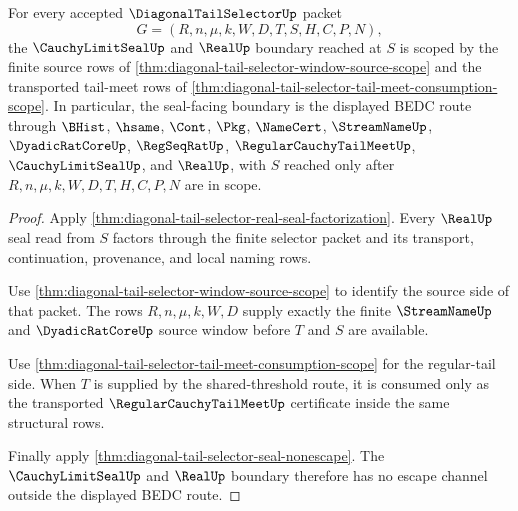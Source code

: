 \begin{theorem}
\label{thm:diagonal-tail-selector-real-seal-boundary-scope}
For every accepted $\DiagonalTailSelectorUp$ packet
$$
G=(R,n,\mu,k,W,D,T,S,H,C,P,N),
$$
the $\CauchyLimitSealUp$ and $\RealUp$ boundary reached at $S$ is scoped by
the finite source rows of \autoref{thm:diagonal-tail-selector-window-source-scope}
and the transported tail-meet rows of
\autoref{thm:diagonal-tail-selector-tail-meet-consumption-scope}. In
particular, the seal-facing boundary is the displayed BEDC route through
$\BHist$, $\hsame$, $\Cont$, $\Pkg$, $\NameCert$, $\StreamNameUp$,
$\DyadicRatCoreUp$, $\RegSeqRatUp$, $\RegularCauchyTailMeetUp$,
$\CauchyLimitSealUp$, and $\RealUp$, with $S$ reached only after
$R,n,\mu,k,W,D,T,H,C,P,N$ are in scope.
\end{theorem}
\begin{proof}
Apply \autoref{thm:diagonal-tail-selector-real-seal-factorization}. Every
$\RealUp$ seal read from $S$ factors through the finite selector packet and
its transport, continuation, provenance, and local naming rows.

Use \autoref{thm:diagonal-tail-selector-window-source-scope} to identify the
source side of that packet. The rows $R,n,\mu,k,W,D$ supply exactly the
finite $\StreamNameUp$ and $\DyadicRatCoreUp$ source window before $T$ and
$S$ are available.

Use \autoref{thm:diagonal-tail-selector-tail-meet-consumption-scope} for the
regular-tail side. When $T$ is supplied by the shared-threshold route, it is
consumed only as the transported $\RegularCauchyTailMeetUp$ certificate
inside the same structural rows.

Finally apply \autoref{thm:diagonal-tail-selector-seal-nonescape}. The
$\CauchyLimitSealUp$ and $\RealUp$ boundary therefore has no escape channel
outside the displayed BEDC route.
\end{proof}


